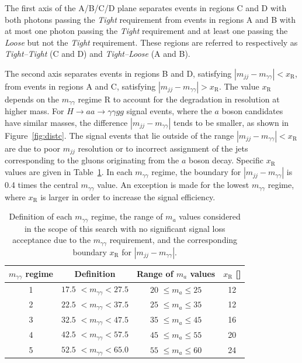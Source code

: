 The first axis of the A/B/C/D plane separates events in regions C and D with both photons passing the \textit{Tight} requirement 
from events in regions A and B with at most one photon 
passing the \textit{Tight} requirement and at least one passing the \textit{Loose} but not the \textit{Tight} requirement. 
These regions are referred to respectively as \textit{Tight--Tight} (C and D) and \textit{Tight--Loose} (A and B). 

The second axis separates events in regions B and D, satisfying $|m_{jj}-m_{\gamma\gamma}|< x_\text{R}$, 
from events in regions A and C, satisfying $|m_{jj}-m_{\gamma\gamma}|>x_\text{R}$. 
The value $x_\text{R}$ depends on the $m_{\gamma\gamma}$ regime R to account for the degradation in resolution at higher mass.
For $H\to aa \to \gamma\gamma gg$ signal events, where the $a$ boson candidates have similar masses, the difference $|m_{jj}-m_{\gamma\gamma}|$ tends to be smaller, 
as shown in Figure~\ref{fig:distc}.
The signal events that lie outside of the range $|m_{jj}-m_{\gamma\gamma}|< x_\text{R}$ are due to poor $m_{jj}$ resolution or to incorrect assignment of the jets corresponding 
to the gluons originating from the $a$ boson decay.
Specific $x_\text{R}$ values are given in Table~\ref{tab:amassdiffcut}.
In each $m_{\gamma\gamma}$ regime, the boundary for $|m_{jj}-m_{\gamma\gamma}|$ is 0.4 times the central $m_{\gamma\gamma}$ value.
An exception is made for the lowest $m_{\gamma\gamma}$ regime, where $x_\text{R}$ is larger in order to increase the signal efficiency.

\begin{table}[t]
  \begin{center}
    \caption{
      Definition of each $m_{\gamma\gamma}$ regime, the range of $m_a$ values considered in the scope of this search with no significant signal loss acceptance due to the $m_{\gamma\gamma}$ requirement, and the corresponding boundary $x_\text{R}$ for $|m_{jj}-m_{\gamma\gamma}|$.  
    }
  \label{tab:amassdiffcut}
    {\footnotesize
  \begin{tabular}{ c c c c }
    \toprule
    $m_{\gamma\gamma}$ regime & Definition & Range of $m_a$ values & $x_\text{R}$ [\GeV{}] \\
    \midrule
    1 & $17.5$ \GeV{} $< m_{\gamma\gamma}< 27.5$ \GeV{} & $20$ \GeV{} $\le m_a \le 25$ \GeV{} & 12 \\
      2 & $22.5$ \GeV{} $< m_{\gamma\gamma}< 37.5$ \GeV{} & $25$ \GeV{} $\le m_a \le 35$ \GeV{} & 12 \\
      3 & $32.5$ \GeV{} $< m_{\gamma\gamma}< 47.5$ \GeV{} & $35$ \GeV{} $\le m_a \le 45$ \GeV{} & 16 \\
      4 & $42.5$ \GeV{} $< m_{\gamma\gamma}< 57.5$ \GeV{} & $45$ \GeV{} $\le m_a \le 55$ \GeV{} & 20 \\
      5 & $52.5$ \GeV{} $< m_{\gamma\gamma}< 65.0$ \GeV{} & $55$ \GeV{} $\le m_a \le 60$ \GeV{} & 24 \\
    \bottomrule
  \end{tabular}
    }
  \end{center}
\end{table}

